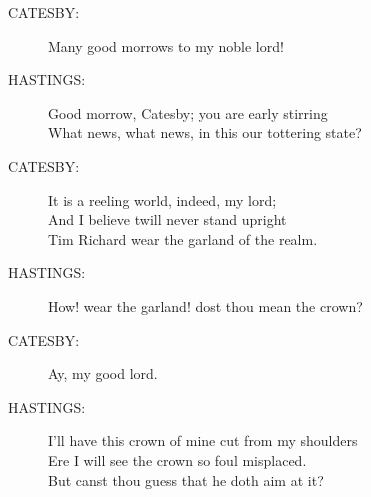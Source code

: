 \documentclass{article}
\begin{document}
\begin{description}
\item[CATESBY:] 
\hspace{1pt}Many good morrows to my noble lord!\\
\end{description}
\begin{description}
\item[HASTINGS:] 
\hspace{1pt}Good morrow, Catesby; you are early stirring\\
\hspace{1pt}What news, what news, in this our tottering state?\\
\end{description}
\begin{description}
\item[CATESBY:] 
\hspace{1pt}It is a reeling world, indeed, my lord;\\
\hspace{1pt}And I believe twill never stand upright\\
\hspace{1pt}Tim Richard wear the garland of the realm.\\
\end{description}
\begin{description}
\item[HASTINGS:] 
\hspace{1pt}How! wear the garland! dost thou mean the crown?\\
\end{description}
\begin{description}
\item[CATESBY:] 
\hspace{1pt}Ay, my good lord.\\
\end{description}
\begin{description}
\item[HASTINGS:] 
\hspace{1pt}I'll have this crown of mine cut from my shoulders\\
\hspace{1pt}Ere I will see the crown so foul misplaced.\\
\hspace{1pt}But canst thou guess that he doth aim at it?\\
\end{description}
\end{document}
